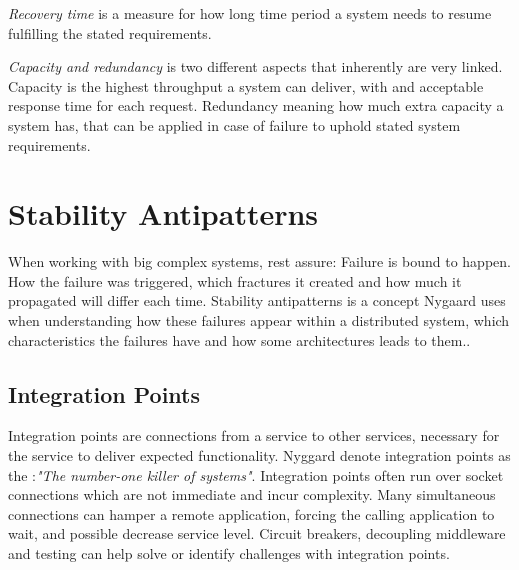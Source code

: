\textit{Recovery time} is a measure for how long time period a system needs to resume fulfilling the stated requirements.


\textit{Capacity and redundancy} is two different aspects that inherently are very linked. Capacity is the highest throughput a system can deliver, with and acceptable response time for each request\cite[p. 136]{nygard2007release}. Redundancy meaning how much extra capacity a system has, that can be applied in case of failure to uphold stated system requirements.


\section{Stability Antipatterns}
\label{sec:stability_antipatterns}
When working with big complex systems, rest assure: Failure is bound to happen. How the failure was triggered, which fractures it created and how much it propagated will differ each time. Stability antipatterns is a concept Nygaard uses when understanding how these failures appear within a distributed system, which characteristics the failures have and how some architectures leads to them.\cite[p. 31]{nygard2007release}.

\subsection{Integration Points}
Integration points are connections from a service to other services, necessary for the service to deliver expected functionality. Nyggard denote integration points as the :\textit{"The number-one killer of systems"}\cite[p. 33]{nygard2007release}. Integration points often run over socket connections which are not immediate and incur complexity. Many simultaneous connections can hamper a remote application, forcing the calling application to wait, and possible decrease service level.
Circuit breakers, decoupling middleware and testing can help solve or identify challenges with integration points.

